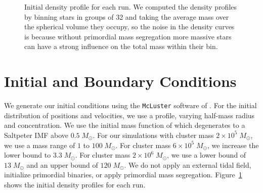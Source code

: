 \documentclass{princeton_astro_thesis}
\newcommand\Msun{\; M_\odot}
\numberwithin{equation}{section}
\begin{document}
\begin{figure}
\centering
{}
\vspace*{-20mm}
\caption{Initial density profile for each run.  We computed the density profiles by binning stars in groups of 32 and taking the average mass over the spherical volume they occupy, so the noise in the density curves is because without primordial mass segregation more massive stars can have a strong influence on the total mass within their bin.}
\label{fig:icpanel}
\end{figure}

\section{Initial and Boundary Conditions}
We generate our initial conditions using the \texttt{McLuster} software of \citet{2011Kupper}. For the initial distribution of positions and velocities, we use a \citet{1966King} profile, varying half-mass radius and concentration.  We use the initial mass function of \citet{2001Kroupa} which degenerates to a Saltpeter IMF above $0.5 \Msun$.  For our simulations with cluster mass $2 \times 10^5 \Msun$, we use a mass range of $1$ to $100 \Msun$.  For cluster mass $6 \times 10^5 \Msun$, we increase the lower bound to $3.3 \Msun$.  For cluster mass $2 \times 10^6 \Msun$, we use a lower bound of $13 \Msun$ and an upper bound of $120 \Msun$.  We do not apply an external tidal field, initialize primordial binaries, or apply primordial mass segregation. Figure~\ref{fig:icpanel} shows the initial density profiles for each run.
\end{document}
